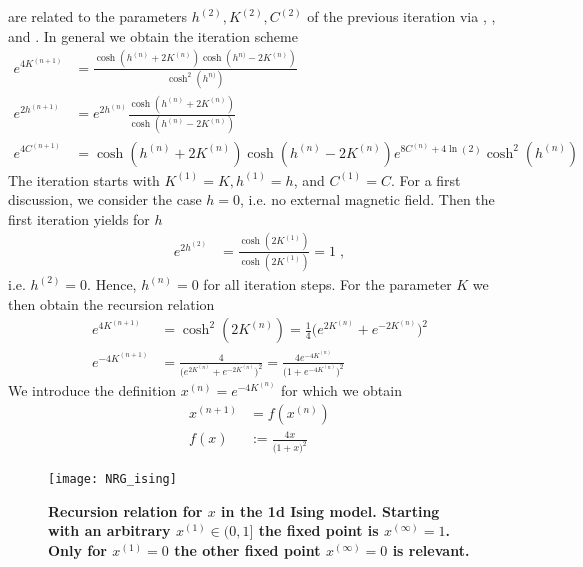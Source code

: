 are related to the parameters $h^{(2)},K^{(2)},C^{(2)}$ of the previous iteration via , , and . In general we obtain the iteration scheme
\begin{subequations}\label{eq:iteration}
\begin{align}
e^{4K^{(n+1)} } &= \frac{\cosh(h^{(n)}+2K^{(n)})\cosh(h^{n)}-2K^{(n)})}{\cosh^{2}(h^{n)})}\\
e^{2h^{(n+1)}} &= e^{2h^{(n)}}\frac{\cosh(h^{(n)}+2K^{(n)})}{\cosh(h^{(n)}-2K^{(n)})}\\
 e^{4C^{(n+1)}} &= \cosh(h^{(n)}+2K^{(n)})\cosh(h^{(n)}-2K^{(n)}) e^{8C^{(n)} + 4\ln(2)} \cosh^{2}(h^{(n)})\;
\end{align}
\end{subequations}
The iteration starts with $K^{(1)}=K, h^{(1)}=h$, and $C^{(1)}=C$.
For a first discussion, we consider the case $h=0$, i.e. no external magnetic field. Then the first iteration yields for $h$
\begin{subequations}\label{eq:iteration:h:0}
\begin{align}
e^{2h^{(2)}} &= \frac{\cosh(2K^{(1)})}{\cosh(2K^{(1)})}=1\;,
\end{align}
\end{subequations}
i.e. $h^{(2)}=0$. Hence, $h^{(n)}=0$ for all iteration steps. For the  parameter $K$ we then obtain
the recursion relation
\begin{align}\label{eq:rec:rel:K}
e^{4K^{(n+1)} } &= \cosh^{2}(2K^{(n)}) =
\frac{1}{4}\bigg( e^{2 K^{(n)}}+e^{-2 K^{(n)}} \bigg)^{2}\\
e^{-4K^{(n+1)} } &= 
\frac{4}{\big( e^{2 K^{(n)}}+e^{-2 K^{(n)}} \big)^{2}}
=\frac{4 e^{-4 K^{(n)}}}{\big( 1+e^{-4 K^{(n)}} \big)^{2}}
\end{align}
We introduce the definition  $x^{(n)} = e^{-4 K^{(n)}}$ for which we obtain
%
\begin{align*}
x^{(n+1)} &= f(x^{(n)})\\
f(x) &:=\frac{4 x}{\big( 1+x \big)^{2}}
\end{align*}
%
\begin{figure}[htbp]
\begin{center}
\texttt{[image: NRG\_ising]}
\caption{{\bf Recursion relation for $x$ in the 1d Ising model. Starting with an arbitrary $x^{(1)}\in(0,1]$ the fixed point is $x^{(\infty)}=1$. Only for
$x^{(1)}=0$ the other fixed point $x^{(\infty)}=0$ is relevant.}}
\end{center}
\end{figure}
